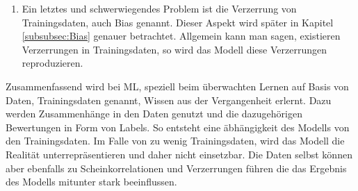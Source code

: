 \begin{onehalfspace}
\begin{enumerate}
\begin{figure}[h]
                \label{fig:Scheinkorrelation}
            \end{figure} \\
            Ein Beispiel dafür ist in Abbildung \ref*{fig:Scheinkorrelation} zu sehen. In der ein Pferdebild nicht anhand der Kontur des Pferdes, sondern anhand des Wasserzeichens in dem Bild erkannt wurde. Grund dafür war, dass einige der Trainingsdaten dieses Wasserzeichen beinhaltet haben und das Modell daraus eine Scheinkorrelation erlernt hat.\cite{Horn2022}\cite{Lapuschkin2016}\cite{Cremers2019}
            \item Ein letztes und schwerwiegendes Problem ist die Verzerrung von Trainingsdaten, auch Bias genannt. Dieser Aspekt wird später in Kapitel \ref*{subsubsec:Bias} genauer betrachtet. Allgemein kann man sagen, existieren Verzerrungen in Trainingsdaten, so wird das Modell diese Verzerrungen reproduzieren.\cite{Cremers2019}
        \end{enumerate}
        Zusammenfassend wird bei \ac*{ML}, speziell beim überwachten Lernen auf Basis von Daten, Trainingsdaten genannt, Wissen aus der Vergangenheit erlernt. Dazu werden Zusammenhänge in den Daten genutzt und die dazugehörigen Bewertungen in Form von Labels. So entsteht eine äbhängigkeit des Modells von den Trainingsdaten. Im Falle von zu wenig Trainingsdaten, wird das Modell die Realität unterrepräsentieren und daher nicht einsetzbar. Die Daten selbst können aber ebenfalls zu Scheinkorrelationen und Verzerrungen führen die das Ergebnis des Modells mitunter stark beeinflussen.\cite{Cremers2019}
 
    \newpage

\end{onehalfspace}
